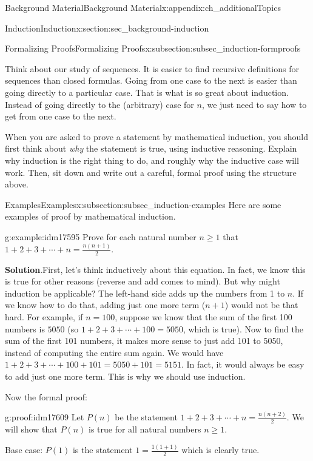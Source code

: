 \documentclass[oneside,10pt,]{book}
\numberwithin{equation}{chapter}
\begin{document}
\begin{appendixptx}{Background Material}{}{Background Material}{}{}{x:appendix:ch_additionalTopics}
\begin{sectionptx}{Induction}{}{Induction}{}{}{x:section:sec_background-induction}
\begin{subsectionptx}{Formalizing Proofs}{}{Formalizing Proofs}{}{}{x:subsection:subsec_induction-formproofs}
\par
Think about our study of sequences. It is easier to find recursive definitions for sequences than closed formulas. Going from one case to the next is easier than going directly to a particular case. That is what is so great about induction. Instead of going directly to the (arbitrary) case for \(n\), we just need to say how to get from one case to the next.%
\par
When you are asked to prove a statement by mathematical induction, you should first think about \emph{why} the statement is true, using inductive reasoning. Explain why induction is the right thing to do, and roughly why the inductive case will work. Then, sit down and write out a careful, formal proof using the structure above.%
\end{subsectionptx}
%
%
\typeout{************************************************}
\typeout{************************************************}
%
\begin{subsectionptx}{Examples}{}{Examples}{}{}{x:subsection:subsec_induction-examples}
Here are some examples of proof by mathematical induction.%
\begin{example}{}{g:example:idm17595}%
Prove for each natural number \(n \ge 1\) that \(1 + 2 + 3 + \cdots + n = \frac{n(n+1)}{2}\).%
\par\smallskip%
\noindent\textbf{Solution}.\hypertarget{g:solution:idm17600}{}\quad{}First, let's think inductively about this equation. In fact, we know this is true for other reasons (reverse and add comes to mind). But why might induction be applicable? The left-hand side adds up the numbers from 1 to \(n\). If we know how to do that, adding just one more term (\(n+1\)) would not be that hard. For example, if \(n = 100\), suppose we know that the sum of the first 100 numbers is \(5050\) (so \(1 + 2 + 3 + \cdots + 100 = 5050\), which is true). Now to find the sum of the first 101 numbers, it makes more sense to just add 101 to 5050, instead of computing the entire sum again. We would have \(1 + 2 + 3 + \cdots + 100 + 101 = 5050 + 101 = 5151\). In fact, it would always be easy to add just one more term. This is why we should use induction.%
\par
Now the formal proof:%
\begin{proofptx}{}{g:proof:idm17609}
Let \(P(n)\) be the statement \(1 + 2 + 3 + \cdots + n = \frac{n(n+2)}{2}\). We will show that \(P(n)\) is true for all natural numbers \(n \ge 1\).%
\par
Base case: \(P(1)\) is the statement \(1 = \frac{1(1+1)}{2}\) which is clearly true.%

\end{proofptx}
\end{example}
\end{subsectionptx}
\end{sectionptx}
\end{appendixptx}
\end{document}
